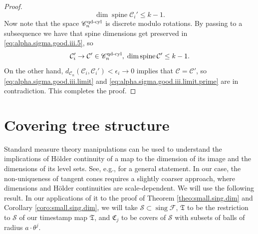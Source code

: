 \documentclass[11pt, letterpaper, reqno]{amsart}
\numberwithin{equation}{section}
\theoremstyle{remark}
\newcommand{\cC}{\mathcal{C}}
\newcommand{\cS}{\mathcal{S}}
\newcommand{\frT}{\mathfrak{T}}
\newcommand{\sing}{\operatorname{sing}}
\newcommand{\spine}{\operatorname{spine}}
\begin{document}
\begin{proof}
\begin{equation}
		\dim \spine \cC_i' \leq k-1.
	\end{equation}
	Now note that the space $\mathscr{C}_{n}^{\textnormal{qd-cyl}}$ is discrete modulo rotations. By passing to a subsequence we have that spine dimensions get preserved in \eqref{eq:alpha.sigma.good.iii.5}, so
	\begin{equation} \label{eq:alpha.sigma.good.iii.limit.prime}
		\cC_i' \to \cC' \in \mathscr{C}_n^{\textnormal{qd-cyl}}, \; \dim \spine \cC' \leq k-1.
	\end{equation}
	On the other hand, $d_{\mathscr{C}_n}(\cC_i, \cC_i') < \epsilon_i \to 0$ implies that $\cC = \cC'$, so \eqref{eq:alpha.sigma.good.iii.limit} and \eqref{eq:alpha.sigma.good.iii.limit.prime} are in contradiction. This completes the proof.
\end{proof}



\section{Covering tree structure}

Standard measure theory manipulations can be used to understand the implications of H\"older continuity of a map to the dimension of its image and the dimensions of its level sets. See, e.g., \cite[Proposition 7.7]{FROS:ihes} for a general statement. In our case, the non-uniqueness of tangent cones requires a slightly coarser approach, where dimensions and H\"older continuities are scale-dependent. We will use the following result. In our applications of it to the proof of Theorem \ref{theo:small.sing.dim} and Corollary \ref{coro:small.sing.dim}, we will take $\cS \subset \sing \mathscr{F}$, $\frT$ to be the restriction to $\cS$ of our timestamp map $\frT$, and $\mathfrak{C}_j$ to be covers of $\cS$ with subsets of balls of radius $a \cdot \theta^j$.
\end{document}
